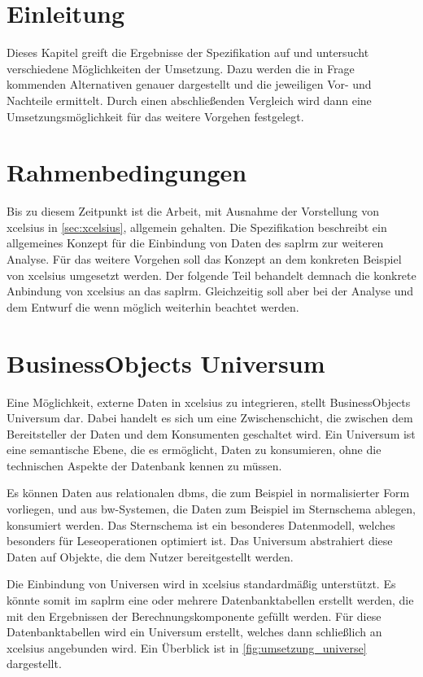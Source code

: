 \begin{onehalfspacing}
\section{Einleitung}
Dieses Kapitel greift die Ergebnisse der Spezifikation auf und untersucht verschiedene Möglichkeiten der Umsetzung. Dazu werden die in Frage kommenden Alternativen genauer dargestellt und die jeweiligen Vor- und Nachteile ermittelt. Durch einen abschließenden Vergleich wird dann eine Umsetzungsmöglichkeit für das weitere Vorgehen festgelegt.

\section{Rahmenbedingungen}
Bis zu diesem Zeitpunkt ist die Arbeit, mit Ausnahme der Vorstellung von \gls{xcelsius} in \vref{sec:xcelsius}, allgemein gehalten. Die Spezifikation beschreibt ein allgemeines Konzept für die Einbindung von Daten des \gls{saplrm} zur weiteren Analyse. Für das weitere Vorgehen soll das Konzept an dem konkreten Beispiel von \gls{xcelsius} umgesetzt werden. Der folgende Teil behandelt demnach die konkrete Anbindung von \gls{xcelsius} an das \gls{saplrm}. Gleichzeitig soll aber bei der Analyse und dem Entwurf die  wenn möglich weiterhin beachtet werden.

\section{BusinessObjects Universum}
Eine Möglichkeit, externe Daten in \gls{xcelsius} zu integrieren, stellt BusinessObjects Universum dar. Dabei handelt es sich um eine Zwischenschicht, die zwischen dem Bereitsteller der Daten und dem Konsumenten geschaltet wird. Ein Universum ist eine semantische Ebene, die es ermöglicht, Daten zu konsumieren, ohne die technischen Aspekte der Datenbank kennen zu müssen.


Es können Daten aus relationalen \gls{dbms}, die zum Beispiel in normalisierter Form vorliegen, und aus \gls{bw}-Systemen, die Daten zum Beispiel im Sternschema ablegen, konsumiert werden. Das Sternschema ist ein besonderes Datenmodell, welches besonders für Leseoperationen optimiert ist. Das Universum abstrahiert diese Daten auf Objekte, die dem Nutzer bereitgestellt werden.

Die Einbindung von Universen wird in \gls{xcelsius} standardmäßig unterstützt. Es könnte somit im \gls{saplrm} eine oder mehrere Datenbanktabellen erstellt werden, die mit den Ergebnissen der Berechnungskomponente gefüllt werden. Für diese Datenbanktabellen wird ein Universum erstellt, welches dann schließlich an \gls{xcelsius} angebunden wird. Ein Überblick ist in \vref{fig:umsetzung_universe} dargestellt.


\end{onehalfspacing}
